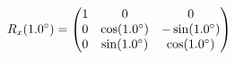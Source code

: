 \documentclass[preview]{standalone}
\begin{document}
\begin{align*}
\special{dvisvgm:raw <g id='unique000'>}R_x(1.0^\circ) = \begin{pmatrix} 1 & 0 & 0 \\ 0 & \cos(1.0^\circ) & -\sin(1.0^\circ) \\ 0 & \sin(1.0^\circ) & \cos(1.0^\circ) \end{pmatrix}\special{dvisvgm:raw </g>}
\end{align*}
\end{document}
